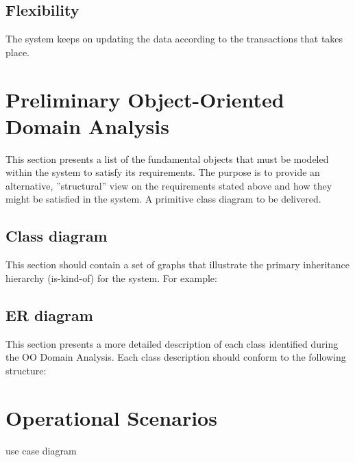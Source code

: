 \documentclass[]{article}
\begin{document}
\subsection {Flexibility}
The system keeps on updating the data according to the transactions that takes place.

\section{Preliminary Object-Oriented Domain Analysis}
This section presents a list of the fundamental objects that must be modeled within the system to satisfy its requirements. The purpose is to provide an alternative, ''structural'' view on the requirements stated above and how they might be satisfied in the system. A primitive class diagram to be delivered.

\subsection{Class diagram}
This section should contain a set of graphs that illustrate the primary inheritance hierarchy (is-kind-of) for the system. For example: 



\subsection{ER diagram}
This section presents a more detailed description of each class identified during the OO Domain Analysis.
Each class description should conform to the following structure: 



\section{Operational Scenarios}
use case diagram
\end{document}
